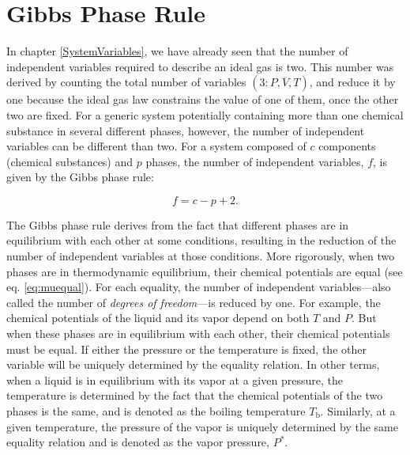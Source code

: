 \documentclass[
  9pt,
]{extbook}
\theoremstyle{definition}
\theoremstyle{definition}
\theoremstyle{definition}
\theoremstyle{definition}
\theoremstyle{remark}
\begin{document}
\section{Gibbs Phase Rule}\label{gibbs-phase-rule}

In chapter \ref{SystemVariables}, we have already seen that the number of independent variables required to describe an ideal gas is two. This number was derived by counting the total number of variables \((3: P,\overline{V},T)\), and reduce it by one because the ideal gas law constrains the value of one of them, once the other two are fixed. For a generic system potentially containing more than one chemical substance in several different phases, however, the number of independent variables can be different than two. For a system composed of \(c\) components (chemical substances) and \(p\) phases, the number of independent variables, \(f\), is given by the Gibbs phase rule:

\begin{equation}
f=c-p+2.
\label{eq:Gibbsrule}
\end{equation}

The Gibbs phase rule derives from the fact that different phases are in equilibrium with each other at some conditions, resulting in the reduction of the number of independent variables at those conditions. More rigorously, when two phases are in thermodynamic equilibrium, their chemical potentials are equal (see eq. \eqref{eq:muequal}). For each equality, the number of independent variables---also called the number of \emph{degrees of freedom}---is reduced by one. For example, the chemical potentials of the liquid and its vapor depend on both \(T\) and \(P\). But when these phases are in equilibrium with each other, their chemical potentials must be equal. If either the pressure or the temperature is fixed, the other variable will be uniquely determined by the equality relation. In other terms, when a liquid is in equilibrium with its vapor at a given pressure, the temperature is determined by the fact that the chemical potentials of the two phases is the same, and is denoted as the boiling temperature \(T_{\text{b}}\). Similarly, at a given temperature, the pressure of the vapor is uniquely determined by the same equality relation and is denoted as the vapor pressure, \(P^*\).
\end{document}
